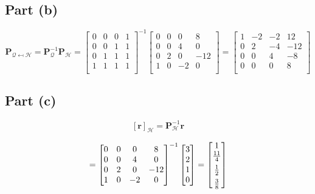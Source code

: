 \documentclass{article}
\begin{document}
\subsection{Part (b)} 

\[%
    \mathbf{P}_{\mathcal{Q}\mapsfrom \mathcal{H}}
    =
    \mathbf{P}_{\mathcal{Q}}^{-1} \mathbf{P}_{\mathcal{H}}
    =
    \begin{bmatrix} 
        0 & 0 & 0 & 1 \\
		0 & 0 & 1 & 1 \\
		0 & 1 & 1 & 1 \\
		1 & 1 & 1 & 1 \\		
    \end{bmatrix}^{-1}
    \begin{bmatrix} 
        0 & 0 & 0 & 8 \\
		0 & 0 & 4 & 0 \\
		0 & 2 & 0 & -12 \\
		1 & 0 & -2 & 0 \\		
    \end{bmatrix}
    =
    \begin{bmatrix} 
        1 & -2 & -2 & 12 \\
		0 & 2  & -4 & -12 \\
		0 & 0  & 4  & -8 \\
		0 & 0  & 0  & 8 \\		
    \end{bmatrix}
\]%

\subsection{Part (c)} 

\[%
    [\mathbf{r}]_{\mathcal{H}} 
    =
    \mathbf{P}_{\mathcal{H}}^{-1}\mathbf{r} 
\]%


\[%
    =
    \begin{bmatrix} 
        0 & 0 & 0 & 8 \\
		0 & 0 & 4 & 0 \\
		0 & 2 & 0 & -12 \\
		1 & 0 & -2 & 0 \\		
    \end{bmatrix}^{-1}  
    \begin{bmatrix} 3\\2\\1\\0 \end{bmatrix}
    =
    \begin{bmatrix} 
        1\\
        \frac{11}{4} \vspace{1.5mm} \\
        \frac{1}{2}  \vspace{1.5mm} \\ 
        \frac{3}{8}  
    \end{bmatrix}
\]%
\end{document}
